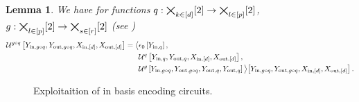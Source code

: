 \documentclass[aps,onecolumn,nofootinbib,pra]{article}
\newtheorem{lemma}{Lemma}
\begin{document}
    \begin{lemma}
        We have for functions $q:\bigtimes_{k\in[d]}[2]\rightarrow\bigtimes_{l\in[p]}[2]$, $g:\bigtimes_{l\in[p]}[2]\rightarrow\bigtimes_{s\in[r]}[2]$ (see )
        \begin{align*}
            \mathcal{U}^{g\circ q}\left[Y_{\mathrm{in},g\circ q},Y_{\mathrm{out},g\circ q},X_{\mathrm{in},[d]},X_{\mathrm{out},[d]}\right]
            = \big\langle 
                &\epsilon_{0}\left[Y_{\mathrm{in},q}\right],\\
                &\mathcal{U}^{q}\left[Y_{\mathrm{in},q},Y_{\mathrm{out},q},X_{\mathrm{in},[d]},X_{\mathrm{out},[d]}\right],\\
                &\mathcal{U}^{g}\left[Y_{\mathrm{in},g\circ q},Y_{\mathrm{out},g\circ q},Y_{\mathrm{out},q},Y_{\mathrm{out},q}\right]
             \big\rangle \big[ 
                Y_{\mathrm{in},g\circ q},Y_{\mathrm{out},g\circ q},X_{\mathrm{in},[d]},X_{\mathrm{out},[d]}
             \big] \, .
        \end{align*}
    \end{lemma}


    \begin{figure}
        \begin{center}
            
        \end{center}
        \caption{
           Exploitaition of \DecompositionSparsity{} in basis encoding circuits.
        }\label{fig:qcbencodingDecomposition}
    \end{figure}
\end{document}
